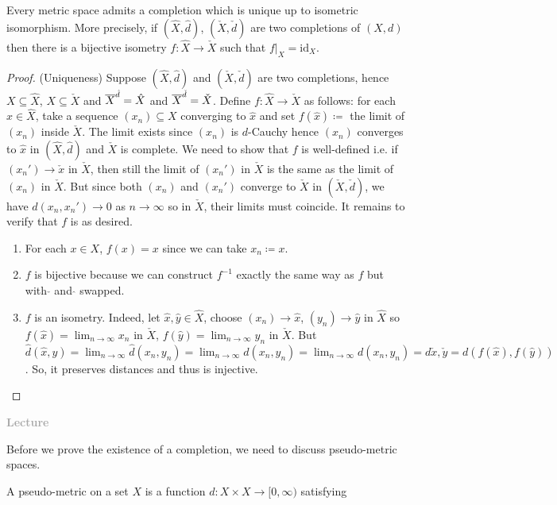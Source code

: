 \documentclass[14pt,oneside]{extarticle}
\newcounter{lecture}
\newcommand{\lecture}{%
  \refstepcounter{lecture}%
  \begin{flushright}
    \textcolor{darkgray}{\textbf{Lecture \thelecture}}
  \end{flushright}%
}
\begin{document}
\begin{theorem*}
  Every metric space admits a completion which is unique up to isometric isomorphism. More precisely, if $(\hat{X}, \hat{d})$, $(\check{X}, \check{d})$ are two completions of $(X,d)$ then there is a bijective isometry $f: \hat{X} \to \check{X}$ such that $f|_X = \text{id}_X$.
\end{theorem*}
\begin{proof}
  (Uniqueness) Suppose $(\hat{X}, \hat{d})$ and $(\check{X}, \check{d})$ are two completions, hence $X \subseteq \hat{X}$, $X \subseteq \check{X}$ and $\overline{X}^{\hat{d}} = \hat{X}$ and $\overline{X}^{\check{d}} = \check{X}$. Define $f: \hat{X} \to \check{X}$ as follows: for each $\hat{x} \in \hat{X}$, take a sequence $(x_n) \subseteq X$ converging to $\hat{x}$ and set $f(\hat{x}) \coloneqq$ the limit of $(x_n)$ inside $\check{X}$. The limit exists since $(x_n)$ is $d$-Cauchy hence $(x_n)$ converges to $\hat{x}$ in $(\hat{X}, \hat{d})$ and $\check{X}$ is complete. We need to show that $f$ is well-defined i.e. if $(x_n') \to \check{x}$ in $\check{X}$, then still the limit of $(x_n')$ in $\check{X}$ is the same as the limit of $(x_n)$ in $\check{X}$. But since both $(x_n)$ and $(x_n')$ converge to $\check{X}$ in $(\check{X}, \check{d})$, we have $d(x_n, x_n') \to 0$ as $n \to \infty$ so in $\check{X}$, their limits must coincide. It remains to verify that $f$ is as desired. 
  \begin{enumerate}[label=\alph*), nosep]
    \item For each $x \in X$, $f(x) = x$ since we can take $x_n \coloneqq x$.
    \item $f$ is bijective because we can construct $f^{-1}$ exactly the same way as $f$ but with $\check{ }$ and $\hat{ }$ swapped.
    \item $f$ is an isometry. Indeed, let $\hat{x}, \hat{y} \in \hat{X}$, choose $(x_n) \to \hat{x}$, $(y_n) \to \hat{y}$ in $\hat{X}$ so $f(\hat{x}) = \lim_{n \to \infty} x_n$ in $\check{X}$, $f(\hat{y}) = \lim_{n \to \infty} y_n$ in $\check{X}$. But $\hat{d}(\hat{x}, \hat{y}) = \lim_{n \to \infty}\hat{d}(x_n, y_n) = \lim_{n \to \infty} d(x_n, y_n) = \lim_{n\to \infty}d(x_n, y_n) = d{\check{x}, \check{y}} = d(f(\hat{x}), f(\hat{y}))$. So, it preserves distances and thus is injective.
  \end{enumerate}
\end{proof}
\lecture
Before we prove the existence of a completion, we need to discuss pseudo-metric spaces.
\begin{definition*}
  A pseudo-metric on a set $X$ is a function $d: X \times X \to [0, \infty)$ satisfying
\end{definition*}
\end{document}
